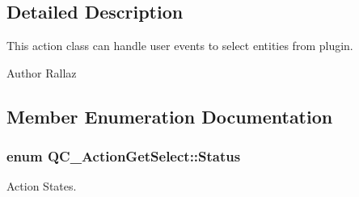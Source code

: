 \subsection{Detailed Description}
This action class can handle user events to select entities from plugin.

\begin{DoxyAuthor}{Author}
Rallaz 
\end{DoxyAuthor}


\subsection{Member Enumeration Documentation}
\hypertarget{classQC__ActionGetSelect_a3ecbb885911489407e842021af3f195b}{
\subsubsection[{Status}]{\setlength{\rightskip}{0pt plus 5cm}enum {\bf Q\-C\-\_\-\-Action\-Get\-Select\-::\-Status}}}\label{classQC__ActionGetSelect_a3ecbb885911489407e842021af3f195b}
Action States. 

